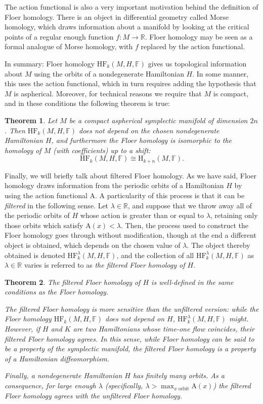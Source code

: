 \documentclass[11pt, a4paper]{article}
\newtheorem{theorem}{Theorem}
\theoremstyle{nonumberplain}
\newcommand{\R}{\mathbb{R}}
\newcommand{\FF}{\mathbb{F}}
\renewcommand{\AA}{\mathrm{A}}
\newcommand{\HF}{\mathrm{HF}}
\newcommand{\HH}{\mathrm{H}}
\newcommand{\asidesize}{\scriptsize}
\begin{document}
{\asidesize
The action functional is also a very important motivation behind the definition of Floer homology. There is an object in differential geometry called Morse homology, which draws information about a manifold by looking at the critical points of a regular enough function $f \colon M \to \R$. Floer homology may be seen as a formal analogue of Morse homology, with $f$ replaced by the action functional.
}

In summary: Floer homology $\HF_k(M,H,\FF)$ gives us topological information about $M$ using the orbits of a nondegenerate Hamiltonian $H$. In some manner, this uses the action functional, which in turn requires adding the hypothesis that $M$ is aspherical. Moreover, for technical reasons we require that $M$ is compact, and in these conditions the following theorem is true:
\begin{theorem}
Let $M$ be a compact aspherical symplectic manifold of dimension $2n$. Then $\HF_k(M,H,\FF)$ does not depend on the chosen nondegenerate Hamiltonian $H$, and furthermore the Floer homology is isomorphic to the homology of $M$ (with coefficients) up to a shift:
\begin{equation}
\HF_k(M,H,\FF) \cong \HH_{k+n}(M,\FF).
\end{equation}
\end{theorem}

Finally, we will briefly talk about filtered Floer homology. As we have said, Floer homology draws information from the periodic orbits of a Hamiltonian $H$ by using the action functional $\AA$. A particularity of this process is that it can be \emph{filtered} in the following sense. Let $\lambda \in \R$, and suppose that we throw away all of the periodic orbits of $H$ whose action is greater than or equal to $\lambda$, retaining only those orbits which satisfy $\AA(x) < \lambda$. Then, the process used to construct the Floer homology goes through without modification, though at the end a different object is obtained, which depends on the chosen value of $\lambda$. The object thereby obtained is denoted $\HF_k^\lambda(M,H,\FF)$, and the collection of all $\HF_k^\lambda(M,H,\FF)$ as $\lambda \in \R$ varies is referred to as \emph{the filtered Floer homology of $H$}.

\begin{theorem}
The filtered Floer homology of $H$ is well-defined in the same conditions as the Floer homology.

The filtered Floer homology is more sensitive than the unfiltered version: while the Floer homology $\HF_k(M,H,\FF)$ does not depend on $H$, $\HF_k^\lambda(M,H,\FF)$ might. However, if $H$ and $K$ are two Hamiltonians whose time-one flow coincides, their filtered Floer homology agrees. In this sense, while Floer homology can be said to be a property of the symplectic manifold, the filtered Floer homology is a property of a Hamiltonian diffeomorphism.

Finally, a nondegenerate Hamiltonian $H$ has finitely many orbits. As a consequence, for large enough $\lambda$ (specifically, $\lambda > \max_{\text{$x$ orbit}} \AA(x)$) the filtered Floer homology agrees with the unfiltered Floer homology.
\end{theorem}
\end{document}
